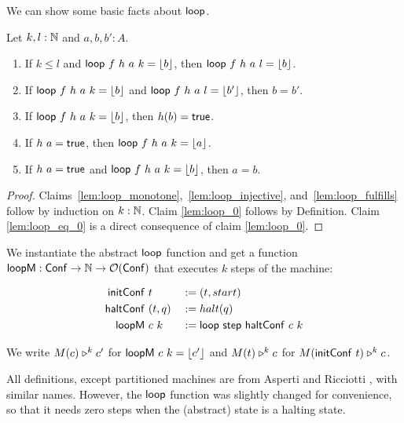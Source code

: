 We can show some basic facts about $\mathsf{loop}$.
\begin{lemma}
  \label{lem:loop}
  Let $k,l : \mathbb{N}$ and $a,b,b':A$.
  \begin{enumerate}
  \item \label{lem:loop_monotone}
    If $k \le l$ and $\mathsf{loop}~f~h~a~k = \left\lfloor {b} \right\rfloor$, then $\mathsf{loop}~f~h~a~l = \left\lfloor {b} \right\rfloor$.
  \item \label{lem:loop_injective}
    If $\mathsf{loop}~f~h~a~k = \left\lfloor {b} \right\rfloor$ and $\mathsf{loop}~f~h~a~l = \left\lfloor {b'} \right\rfloor$, then $b = b'$.
  \item \label{lem:loop_fulfills}
    If $\mathsf{loop}~f~h~a~k = \left\lfloor {b} \right\rfloor$, then $h(b) = \mathsf{true}$.
  \item \label{lem:loop_0}
    If $h~a = \mathsf{true}$, then $\mathsf{loop}~f~h~a~k = \left\lfloor {a} \right\rfloor$.
  \item \label{lem:loop_eq_0}
    If $h~a = \mathsf{true}$ and $\mathsf{loop}~f~h~a~k = \left\lfloor {b} \right\rfloor$, then $a=b$.
  \end{enumerate}
\end{lemma}
\begin{proof}
  Claims~\ref{lem:loop_monotone},~\ref{lem:loop_injective}, and~\ref{lem:loop_fulfills} follow by induction on $k : \mathbb{N}$.  Claim \ref{lem:loop_0}
  follows by Definition.  Claim \ref{lem:loop_eq_0} is a direct consequence of claim \ref{lem:loop_0}.
\end{proof}


We instantiate the abstract $\mathsf{loop}$ function and get a function $\mathsf{loopM} : \mathsf{Conf} \rightarrow \mathbb{N} \rightarrow \mathcal{O}(\mathsf{Conf})$ that executes $k$ steps of the
machine:
\begin{definition}
  \begin{alignat*}{3}
    \mathsf{initConf}   &~t         &&:= (t, start) \\
    \mathsf{haltConf}   &~(t, q)    &&:= halt(q) \\
    \mathsf{loopM}      &~c~k       &&:= \mathsf{loop}~\mathsf{step}~\mathsf{haltConf}~c~k
  \end{alignat*}
\end{definition}

We write $M(c) \mathrel{\triangleright}^k c'$ for $\mathsf{loopM}~c~k = \left\lfloor {c'} \right\rfloor$ and $M(t) \mathrel{\triangleright}^k c$ for $M(\mathsf{initConf}~t) \mathrel{\triangleright}^k c$.

All definitions, except partitioned machines are from Asperti and Ricciotti \cite{asperti2015}, with similar names.  However, the $\mathsf{loop}$ function
was slightly changed for convenience, so that it needs zero steps when the (abstract) state is a halting state.

